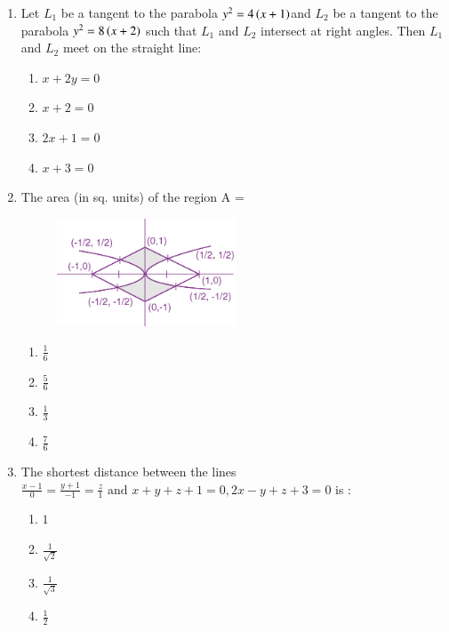\documentclass[journal]{IEEEtran}
\theoremstyle{remark}
\begin{document}
\begin{enumerate}
\item  Let $L_1$ be a tangent to the parabola $y^2 = 4 \left(x+1\right)$and $L_2$ be a tangent to the parabola $y^2 = 8\left(x+2\right)$ such that $L_1$ and $L_2$ intersect at right angles. Then $L_1$ and $L_2$ meet on the straight line:

\begin{multicols}{4}
\begin{enumerate}
\item $x+2y = 0$
\item $ x+2 = 0$
\item $ 2x+1 = 0$
\item $x+3 = 0$
\end{enumerate}
\end{multicols}

\item  The area (in sq. units) of the region A = 

\begin{figure}[h] 
    \centering
    \includegraphics[width=0.5\textwidth]{figure/5.png}
\end{figure}

\begin{multicols}{4}
\begin{enumerate}
\item $\frac{1}{6}$
\item $\frac{5}{6}$
\item $\frac{1}{3}$
\item $\frac{7}{6}$
\end{enumerate}
\end{multicols}

\item  The shortest distance between the lines $\frac{x - 1}{0} = \frac{y + 1}{-1} = \frac{z}{1} \text{ and } x+y+z+1 = 0, 2x-y+z+3 = 0$ is :

\begin{multicols}{4}
\begin{enumerate}
\item $1$
\item $\frac{1}{\sqrt{2}}$
\item $\frac{1}{\sqrt{3}}$
\item $\frac{1}{2}$
\end{enumerate}
\end{multicols}


\end{enumerate}
\end{document}
